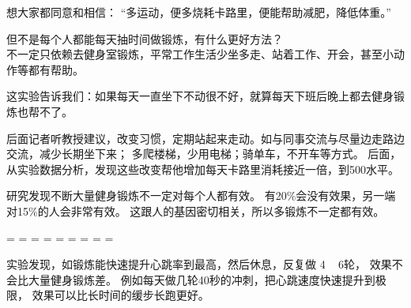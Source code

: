 想大家都同意和相信：
``多运动，便多烧耗卡路里，便能帮助减肥，降低体重。''



但不是每个人都能每天抽时间做锻炼，有什么更好方法？\\
不一定只依赖去健身室锻炼，平常工作生活少坐多走、站着工作、开会，甚至小动作等都有帮助。


这实验告诉我们：如果每天一直坐下不动很不好，就算每天下班后晚上都去健身锻炼也帮不了。

后面记者听教授建议，改变习惯，定期站起来走动。如与同事交流与尽量边走路边交流，减少长期坐下来；
多爬楼梯，少用电梯；骑单车，不开车等方式。
后面，从实验数据分析，发现这些改变帮他增加每天卡路里消耗接近一倍，到500水平。

研究发现不断大量健身锻炼不一定对每个人都有效。
有20\%会没有效果，另一端对15\%的人会非常有效。
这跟人的基因密切相关，所以多锻炼不一定都有效。

\begin{description}
\tightlist
\item[]
= = = = = = = = =
\end{description}

实验发现，如锻炼能快速提升心跳率到最高，然后休息，反复做 4 ~ 6轮，
效果不会比大量健身锻炼差。
例如每天做几轮40秒的冲刺，把心跳速度快速提升到极限，
效果可以比长时间的缓步长跑更好。

